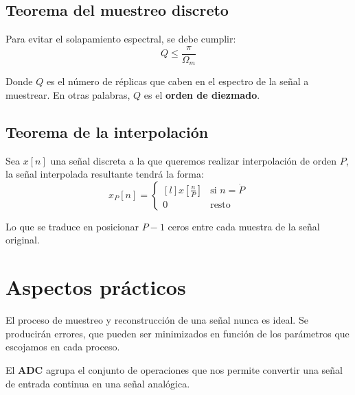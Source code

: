 \documentclass[a4paper]{book}
\begin{document}
\subsection{Teorema del muestreo discreto}

Para evitar el solapamiento espectral, se debe cumplir: \[ Q \leq \frac{\pi}{\Omega_m}\]

Donde $Q$ es el número de réplicas que caben en el espectro de la señal a muestrear. En otras palabras, $Q$ es el \textbf{orden de diezmado}.

\subsection{Teorema de la interpolación}

Sea $x[n]$ una señal discreta a la que queremos realizar interpolación de orden $P$, la señal interpolada resultante tendrá la forma:
\[ x_P[n] = \left\lbrace 
\begin{matrix*}[l]
	x \left[ \frac{n}{P} \right] & \text{si } n = \dot{P}\\[5pt]
	0 & \text{resto}
\end{matrix*} \right.\]

Lo que se traduce en posicionar $P-1$ ceros entre cada muestra de la señal original.


\section{Aspectos prácticos}

El proceso de muestreo y reconstrucción de una señal nunca es ideal. Se producirán errores, que pueden ser minimizados en función de los parámetros que escojamos en cada proceso.

El \textbf{ADC} agrupa el conjunto de operaciones que nos permite convertir una señal de entrada continua en una señal analógica.
\end{document}
